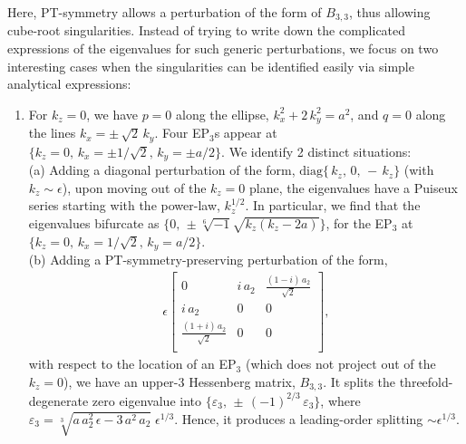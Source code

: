 \documentclass[aps, prb, onecolumn, nofootinbib, citeautoscript, 10pt]{revtex4-2}
\begin{document}
Here, PT-symmetry allows a perturbation of the form of $B_{3,3}$, thus allowing cube-root singularities. 
Instead of trying to write down the complicated expressions of the eigenvalues for such generic perturbations, we focus on two interesting cases when the singularities can be identified easily via simple analytical expressions:
\begin{enumerate}

\item For $k_z= 0$, we have $p=0$ along the ellipse, $k_x^2 + 2\, k_y^2 =  a^2$, and $q= 0 $ along the lines $k_x = \pm \,\sqrt 2 \,k_y$.
Four EP$_3$s appear at $\lbrace k_z = 0, \, k_x = \pm 1/\sqrt 2, \, k_y = \pm a/ 2 \rbrace$. We identify 2 distinct situations: 
\\(a) Adding a diagonal perturbation of the form, $\text{diag} \lbrace \,k_z,\,0,\, -\,k_z \rbrace $ (with $k_z \sim \epsilon $), upon moving out of the $k_z = 0$ plane, the eigenvalues have a Puiseux series starting with the power-law, $k_z^{1/2}$. In particular, we find that the eigenvalues bifurcate as $\lbrace 0, \, \pm \sqrt[6]{-1} \sqrt{k_z \left(k_z-2 a\right)} \rbrace $, for the EP$_3$ at $\lbrace k_z = 0, \, k_x =  1/\sqrt 2, \, k_y =  a/ 2 \rbrace $.
\\(b) Adding a PT-symmetry-preserving perturbation of the form,
 \begin{align}
\epsilon \begin{bmatrix}
 0 & i \,a_2 & \frac{(1-i)\, a_2} {\sqrt{2}} \\
 i \,a_2 & 0 & 0 \\
 \frac{(1+i) \,a_2} {\sqrt{2}} & 0 & 0 \\
 \end{bmatrix},
 \end{align}
with respect to the location of an EP$_3$ (which does not project out of the $k_z = 0$), we have an upper-3 Hessenberg matrix, $B_{3,3}$. It splits the threefold-degenerate zero eigenvalue into $\lbrace  \varepsilon_3  ,\, \pm \,(-1)^{2/3}\,  \varepsilon_3   \rbrace $, where $ \varepsilon_3 =  \sqrt[3]{a \,a_2^2 \,\epsilon -3 \,a^2\, a_2  }\; \epsilon^{1/3}$.
Hence, it produces a leading-order splitting $\sim \epsilon^{1/3}$.



\end{enumerate}
\end{document}
